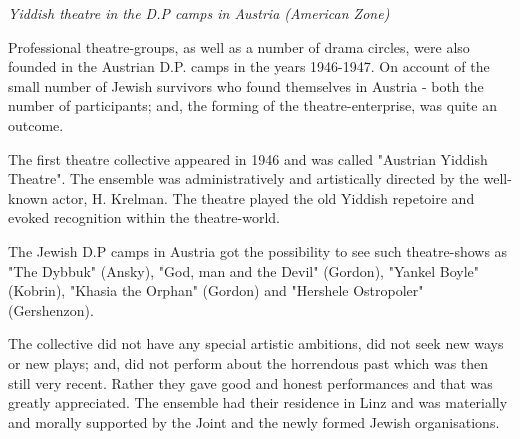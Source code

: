\documentclass{article}
\begin{document}
\begin{pairs}
\begin{Leftside}
\begin{english}
\beginnumbering
\autopar
\emph{
Yiddish theatre in the D.P camps in Austria (American Zone)
}
\newline 
 
Professional theatre-groups, as well as a number of drama circles, were also founded in the Austrian D.P. camps in the years 1946-1947.
On account of the small number of Jewish survivors who found themselves in Austria - both the number of participants; and, the forming of
the theatre-enterprise, was quite an outcome.

The first theatre collective appeared in 1946 and was called "Austrian Yiddish Theatre". The ensemble was administratively and 
artistically directed by the well-known actor, H. Krelman. 
The theatre played the old Yiddish repetoire and
evoked recognition within the theatre-world.

The Jewish D.P camps in Austria got the possibility to see such theatre-shows as "The Dybbuk" (Ansky),
"God, man and the Devil" (Gordon), "Yankel Boyle" (Kobrin), "Khasia the Orphan" (Gordon) and "Hershele Ostropoler" (Gershenzon).

The collective did not have any special artistic ambitions, did not seek new ways or new plays; and, did not perform about the horrendous past which was then still
very recent. Rather they gave good and honest performances and that was greatly appreciated. The ensemble had their residence in Linz and was materially and morally
supported by the Joint and the newly formed Jewish organisations.

\endnumbering
\end{english}
\end{Leftside}

\end{pairs}
\Columns
\end{document}
